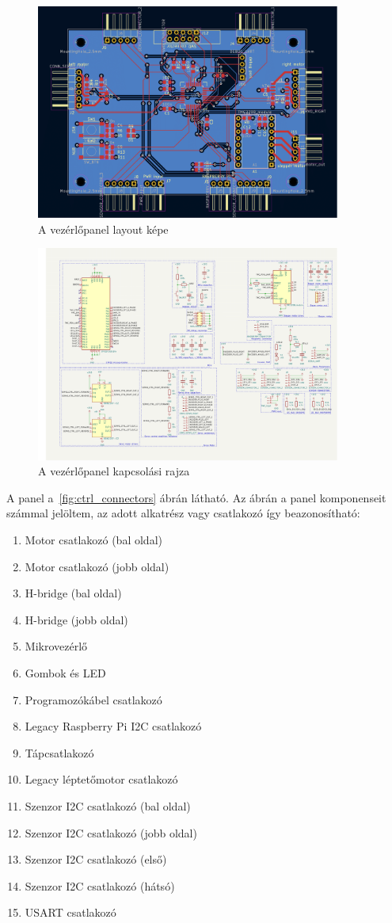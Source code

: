 \begin{figure}
  \centering \includegraphics[width=100mm,
    keepaspectratio]{figures/ch1/movement-control-layout.png}
  \caption{A vezérlőpanel layout képe}
  \label{fig:crtl_layout}
\end{figure}

\begin{figure}
  \centering \includegraphics[width=100mm,
    keepaspectratio]{figures/ch1/movement-control-schematic.png}
  \caption{A vezérlőpanel kapcsolási rajza}
  \label{fig:ctrl_layout}
\end{figure}

A panel a~\ref{fig:ctrl_connectors} ábrán látható. Az ábrán a panel komponenseit
számmal jelöltem, az adott alkatrész vagy csatlakozó így beazonosítható:
\begin{enumerate}
\item Motor csatlakozó (bal oldal)
\item Motor csatlakozó (jobb oldal)
\item H-bridge (bal oldal)
\item H-bridge (jobb oldal)
\item Mikrovezérlő
\item Gombok és LED
\item Programozókábel csatlakozó
\item Legacy Raspberry Pi I2C csatlakozó
\item Tápcsatlakozó
\item Legacy léptetőmotor csatlakozó
\item Szenzor I2C csatlakozó (bal oldal)
\item Szenzor I2C csatlakozó (jobb oldal)
\item Szenzor I2C csatlakozó (első)
\item Szenzor I2C csatlakozó (hátsó)
\item USART csatlakozó
\end{enumerate}

